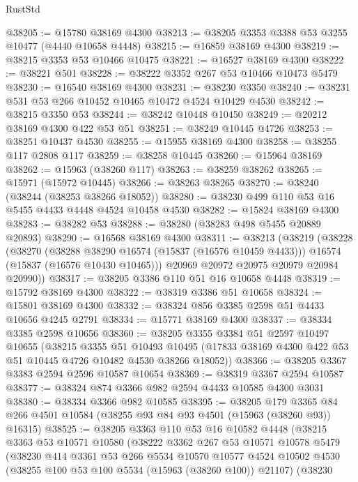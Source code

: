 \begin{lexlean}{RustStd}
\begin{coremodule}
{\begin{coremodule}
{{{{{{{{{{{{{{{{{{{{{{{{{{{{{{{{{{{{{{{{{{{{{{{{{{{{{{{{{{{{@38205 := @15780 @38169 @4300
@38213 := @38205 @3353 @3388 @53 @3255 @10477 (@4440 @10658 @4448)
@38215 := @16859 @38169 @4300
@38219 := @38215 @3353 @53 @10466 @10475
@38221 := @16527 @38169 @4300
@38222 := @38221 @501
@38228 := @38222 @3352 @267 @53 @10466 @10473 @5479
@38230 := @16540 @38169 @4300
@38231 := @38230 @3350
@38240 := @38231 @531 @53 @266 @10452 @10465 @10472 @4524 @10429 @4530
@38242 := @38215 @3350 @53
@38244 := @38242 @10448 @10450
@38249 := @20212 @38169 @4300 @422 @53 @51
@38251 := @38249 @10445 @4726
@38253 := @38251 @10437 @4530
@38255 := @15955 @38169 @4300
@38258 := @38255 @117 @2808 @117
@38259 := @38258 @10445
@38260 := @15964 @38169
@38262 := @15963 (@38260 @117)
@38263 := @38259 @38262
@38265 := @15971 (@15972 @10445)
@38266 := @38263 @38265
@38270 := @38240 (@38244 (@38253 @38266 @18052))
@38280 := @38230 @499 @110 @53 @16 @5455 @4433 @4448 @4524 @10458 @4530
@38282 := @15824 @38169 @4300
@38283 := @38282 @53
@38288 := @38280 (@38283 @498 @5455 @20889 @20893)
@38290 := @16568 @38169 @4300
@38311 := @38213
    (@38219
      (@38228
        (@38270
          (@38288 @38290 @16574 (@15837 (@16576 @10459 @4433)))
          @16574
          (@15837 (@16576 @10430 @10465)))
        @20969
        @20972
        @20975
        @20979
        @20984
        @20990))
@38317 := @38205 @3386 @110 @51 @16 @10658 @4448
@38319 := @15792 @38169 @4300
@38322 := @38319 @3386 @51 @10658
@38324 := @15801 @38169 @4300
@38332 := @38324 @856 @3385 @2598 @51 @4433 @10656 @4245 @2791
@38334 := @15771 @38169 @4300
@38337 := @38334 @3385 @2598 @10656
@38360 := @38205
    @3355
    @3384
    @51
    @2597
    @10497
    @10655
    (@38215
      @3355
      @51
      @10493
      @10495
      (@17833 @38169 @4300 @422 @53 @51 @10445 @4726 @10482 @4530 @38266 @18052))
@38366 := @38205 @3367 @3383 @2594 @2596 @10587 @10654
@38369 := @38319 @3367 @2594 @10587
@38377 := @38324 @874 @3366 @982 @2594 @4433 @10585 @4300 @3031
@38380 := @38334 @3366 @982 @10585
@38395 := @38205
    @179
    @3365
    @84
    @266
    @4501
    @10584
    (@38255 @93 @84 @93 @4501 (@15963 (@38260 @93)) @16315)
@38525 := @38205
    @3363
    @110
    @53
    @16
    @10582
    @4448
    (@38215
      @3363
      @53
      @10571
      @10580
      (@38222
        @3362
        @267
        @53
        @10571
        @10578
        @5479
        (@38230
          @414
          @3361
          @53
          @266
          @5534
          @10570
          @10577
          @4524
          @10502
          @4530
          (@38255 @100 @53 @100 @5534 (@15963 (@38260 @100)) @21107)
          (@38230
}}}}}}}}}}}}}}}}}}}}}}}}}}}}}}}}}}}}}}}}}}}}}}}}}}}}}}}}}}}}
\end{coremodule}}
\end{coremodule}
\end{lexlean}
